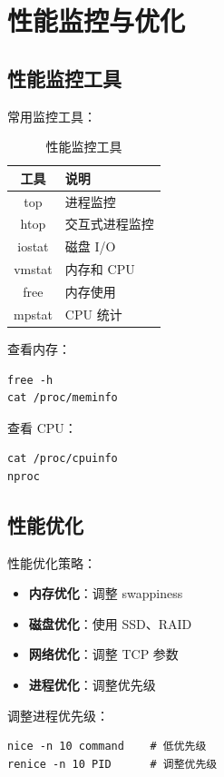 \documentclass[12pt,UTF8]{ctexbook}
\begin{document}
\chapter{性能监控与优化}
\label{chap:performance}

\section{性能监控工具}
\label{sec:monitoring_tools}

常用监控工具：
\begin{table}[htbp]
    \centering
    \caption{性能监控工具}
    \begin{tabular}{|c|p{8cm}|}
        \hline
        \textbf{工具} & \textbf{说明} \\
        \hline
        top & 进程监控 \\
        \hline
        htop & 交互式进程监控 \\
        \hline
        iostat & 磁盘 I/O \\
        \hline
        vmstat & 内存和 CPU \\
        \hline
        free & 内存使用 \\
        \hline
        mpstat & CPU 统计 \\
        \hline
    \end{tabular}
\end{table}

查看内存：
\begin{verbatim}
free -h
cat /proc/meminfo
\end{verbatim}

查看 CPU：
\begin{verbatim}
cat /proc/cpuinfo
nproc
\end{verbatim}

\section{性能优化}
\label{sec:optimization}

性能优化策略：
\begin{itemize}
    \item \textbf{内存优化}：调整 swappiness
    \item \textbf{磁盘优化}：使用 SSD、RAID
    \item \textbf{网络优化}：调整 TCP 参数
    \item \textbf{进程优化}：调整优先级
\end{itemize}

调整进程优先级：
\begin{verbatim}
nice -n 10 command    # 低优先级
renice -n 10 PID      # 调整优先级
\end{verbatim}

\backmatter
\end{document}
